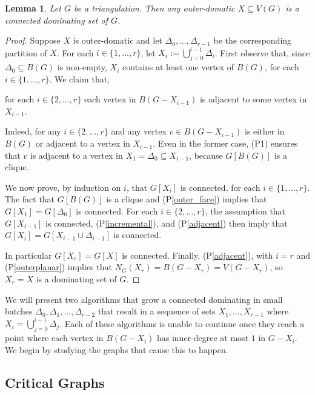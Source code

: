 \documentclass[12pt]{article}
\newcommand{\pref}[1]{(P\ref{#1})}
\newtheorem{lem}{Lemma}
\theoremstyle{definition}
\begin{document}
\begin{lem}\label{outer_domatic}
    Let $G$ be a triangulation.  Then any outer-domatic $X\subseteq V(G)$ is a connected dominating set of $G$.
\end{lem}

\begin{proof}
  Suppose $X$ is outer-domatic and let $\Delta_0,\ldots,\Delta_{r-1}$ be the corresponding partition of $X$.  For each $i\in\{1,\ldots,r\}$, let $X_i:=\bigcup_{j=0}^{i-1} \Delta_i$.  First observe that, since $\Delta_0\subseteq B(G)$ is non-empty, $X_i$ contains at least one vertex of $B(G)$, for each $i\in\{1,\ldots,r\}$. We claim that,
  \begin{compactenum}[(P1)]\setcounter{enumi}{3}
    \item for each $i\in\{2,\ldots,r\}$ each vertex in $B(G-X_{i-1})$ is adjacent to some vertex in $X_{i-1}$. \label{adjacent}
  \end{compactenum}
  Indeed, for any $i\in\{2,\ldots,r\}$ and any vertex $v\in B(G-X_{i-1})$ is either in $B(G)$ or adjacent to a vertex in $X_{i-1}$. Even in the former case, (P1) ensures that $v$ is adjacent to a vertex in $X_1=\Delta_0\subseteq X_{i-1}$, because $G[B(G)]$ is a clique.

  We now prove, by induction on $i$, that $G[X_i]$ is connected, for each $i\in\{1,\ldots,r\}$.
  The fact that $G[B(G)]$ is a clique and \pref{outer_face} implies that $G[X_1]=G[\Delta_0]$ is connected. For each $i\in\{2,\ldots,r\}$, the assumption that $G[X_{i-1}]$ is connected, \pref{incremental}, and \pref{adjacent} then imply that $G[X_i]=G[X_{i-1}\cup\Delta_{i-1}]$ is connected.

  In particular $G[X_r]=G[X]$ is connected.  Finally, \pref{adjacent}, with $i=r$ and \pref{outerplanar} implies that $N_G(X_r)=B(G-X_r)=V(G-X_r)$, so $X_r=X$ is a dominating set of $G$.
\end{proof}

We will present two algorithms that grow a connected dominating in small batches $\Delta_0,\Delta_1,\ldots,\Delta_{r-2}$ that result in a sequence of sets $X_1,\ldots,X_{r-1}$ where $X_{i}=\bigcup_{j=0}^{i-1}\Delta_j$.  Each of these algorithms is unable to continue once they reach a point where each vertex in $B(G-X_i)$ has inner-degree at most $1$ in $G-X_i$.  We begin by studying the graphs that cause this to happen.

\subsection{Critical Graphs}
\end{document}
